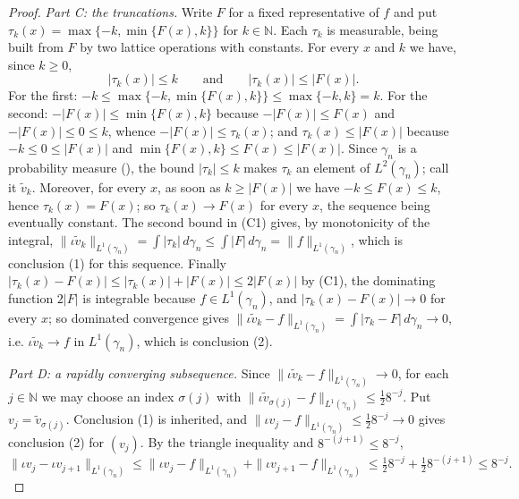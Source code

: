 \begin{proof}
\emph{Part C: the truncations.}
Write $F$ for a fixed representative of $f$ and put
$\tau_k(x) = \max\{-k, \min\{F(x), k\}\}$ for $k \in \mathbb{N}$.  Each $\tau_k$ is
measurable, being built from $F$ by two lattice operations with constants.  For every
$x$ and $k$ we have, since $k \geq 0$,
\begin{equation*}
  |\tau_k(x)| \leq k \qquad\text{and}\qquad |\tau_k(x)| \leq |F(x)| .
  \tag{C1}
\end{equation*}
For the first: $-k \leq \max\{-k,\min\{F(x),k\}\} \leq \max\{-k,k\} = k$.  For the
second: $-|F(x)| \leq \min\{F(x),k\}$ because $-|F(x)| \leq F(x)$ and
$-|F(x)| \leq 0 \leq k$, whence $-|F(x)| \leq \tau_k(x)$; and
$\tau_k(x) \leq |F(x)|$ because $-k \leq 0 \leq |F(x)|$ and
$\min\{F(x),k\} \leq F(x) \leq |F(x)|$.
Since $\gamma_n$ is a probability measure (), the bound
$|\tau_k| \leq k$ makes $\tau_k$ an element of $L^2(\gamma_n)$; call it $\tilde v_k$.
Moreover, for every $x$, as soon as $k \geq |F(x)|$ we have
$-k \leq F(x) \leq k$, hence $\tau_k(x) = F(x)$; so
$\tau_k(x) \to F(x)$ for every $x$, the sequence being eventually constant.
The second bound in (C1) gives, by monotonicity of the integral,
$\|\iota \tilde v_k\|_{L^1(\gamma_n)} = \int|\tau_k|\,d\gamma_n
  \leq \int |F|\,d\gamma_n = \|f\|_{L^1(\gamma_n)}$,
which is conclusion (1) for this sequence.  Finally
$|\tau_k(x) - F(x)| \leq |\tau_k(x)| + |F(x)| \leq 2|F(x)|$ by (C1), the dominating
function $2|F|$ is integrable because $f \in L^1(\gamma_n)$, and
$|\tau_k(x) - F(x)| \to 0$ for every $x$; so dominated convergence gives
$\|\iota\tilde v_k - f\|_{L^1(\gamma_n)} = \int|\tau_k - F|\,d\gamma_n \to 0$, i.e.
$\iota\tilde v_k \to f$ in $L^1(\gamma_n)$, which is conclusion (2).

\emph{Part D: a rapidly converging subsequence.}
Since $\|\iota\tilde v_k - f\|_{L^1(\gamma_n)} \to 0$, for each $j \in \mathbb{N}$ we
may choose an index $\sigma(j)$ with
$\|\iota\tilde v_{\sigma(j)} - f\|_{L^1(\gamma_n)} \leq \tfrac12 8^{-j}$.  Put
$v_j = \tilde v_{\sigma(j)}$.  Conclusion (1) is inherited, and
$\|\iota v_j - f\|_{L^1(\gamma_n)} \leq \tfrac12 8^{-j} \to 0$ gives conclusion (2)
for $(v_j)$.  By the triangle inequality and $8^{-(j+1)} \leq 8^{-j}$,
\begin{equation*}
  \|\iota v_j - \iota v_{j+1}\|_{L^1(\gamma_n)}
    \leq \|\iota v_j - f\|_{L^1(\gamma_n)} + \|\iota v_{j+1} - f\|_{L^1(\gamma_n)}
    \leq \tfrac12 8^{-j} + \tfrac12 8^{-(j+1)} \leq 8^{-j} .
  \tag{D}
\end{equation*}


\end{proof}
